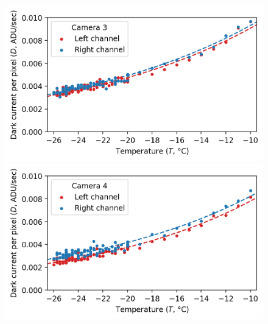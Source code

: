 \begin{colsection}
\begin{figure}[p]
\begin{center}
        \begin{minipage}[t]{0.49\linewidth}\vspace{10pt}
            \includegraphics[width=\linewidth]{images/detectors/dc_3.png}
        \end{minipage}
        \begin{minipage}[t]{0.49\linewidth}\vspace{10pt}
            \includegraphics[width=\linewidth]{images/detectors/dc_4.png}
        \end{minipage}


\end{center}
\end{figure}
\end{colsection}
